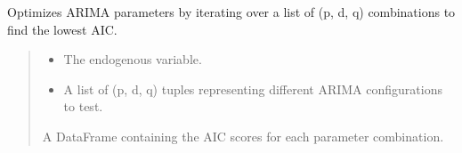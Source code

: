 \documentclass[letterpaper,10pt,english]{sphinxmanual}
\begin{document}
\begin{fulllineitems}
\label{\detokenize{docs/time_series_analysis:time_series_analysis.optimize_ARIMA}}
\pysigstartsignatures
{}
\pysigstopsignatures
\sphinxAtStartPar
Optimizes ARIMA parameters by iterating over a list of (p, d, q) combinations to find the lowest AIC.
\begin{quote}\begin{description}
\begin{itemize}
\item {} 
\sphinxAtStartPar
{} \textendash{} The endogenous variable.

\item {} 
\sphinxAtStartPar
{} \textendash{} A list of (p, d, q) tuples representing different ARIMA configurations to test.

\end{itemize}

\sphinxAtStartPar
A DataFrame containing the AIC scores for each parameter combination.

\end{description}\end{quote}

\end{fulllineitems}

\end{document}
